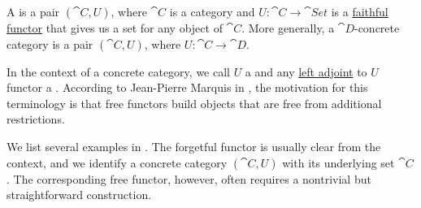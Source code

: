 \begin{definition}\label{def:concrete_category}
  A  is a pair \( (\cat{C}, U) \), where \( \cat{C} \) is a category and \( U: \cat{C} \to \cat{Set} \) is a \hyperref[def:functor_invertibility/faithful]{faithful functor} that gives us a set for any object of \( \cat{C} \). More generally, a \( \cat{D} \)-concrete category is a pair \( (\cat{C}, U) \), where \( U: \cat{C} \to \cat{D} \).

  In the context of a concrete category, we call \( U \) a  and any \hyperref[def:category_adjunction]{left adjoint} to \( U \) functor a . According to Jean-Pierre Marquis in \cite{StanfordPlato:category_theory}, the motivation for this terminology is that free functors build objects that are free from additional restrictions.

  We list several examples in . The forgetful functor is usually clear from the context, and we identify a concrete category \( (\cat{C}, U) \) with its underlying set \( \cat{C} \). The corresponding free functor, however, often requires a nontrivial but straightforward construction.
\end{definition}

